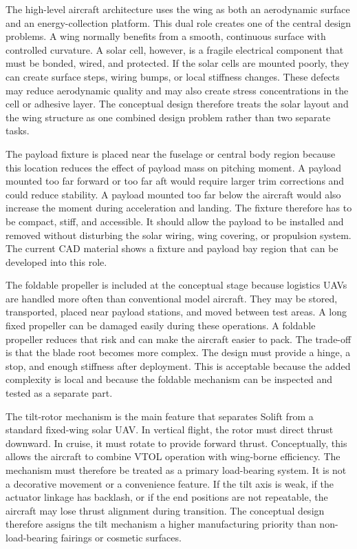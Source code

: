 The high-level aircraft architecture uses the wing as both an aerodynamic surface and an energy-collection platform. This dual role creates one of the central design problems. A wing normally benefits from a smooth, continuous surface with controlled curvature. A solar cell, however, is a fragile electrical component that must be bonded, wired, and protected. If the solar cells are mounted poorly, they can create surface steps, wiring bumps, or local stiffness changes. These defects may reduce aerodynamic quality and may also create stress concentrations in the cell or adhesive layer. The conceptual design therefore treats the solar layout and the wing structure as one combined design problem rather than two separate tasks.

The payload fixture is placed near the fuselage or central body region because this location reduces the effect of payload mass on pitching moment. A payload mounted too far forward or too far aft would require larger trim corrections and could reduce stability. A payload mounted too far below the aircraft would also increase the moment during acceleration and landing. The fixture therefore has to be compact, stiff, and accessible. It should allow the payload to be installed and removed without disturbing the solar wiring, wing covering, or propulsion system. The current CAD material shows a fixture and payload bay region that can be developed into this role.

The foldable propeller is included at the conceptual stage because logistics UAVs are handled more often than conventional model aircraft. They may be stored, transported, placed near payload stations, and moved between test areas. A long fixed propeller can be damaged easily during these operations. A foldable propeller reduces that risk and can make the aircraft easier to pack. The trade-off is that the blade root becomes more complex. The design must provide a hinge, a stop, and enough stiffness after deployment. This is acceptable because the added complexity is local and because the foldable mechanism can be inspected and tested as a separate part.

The tilt-rotor mechanism is the main feature that separates Solift from a standard fixed-wing solar UAV. In vertical flight, the rotor must direct thrust downward. In cruise, it must rotate to provide forward thrust. Conceptually, this allows the aircraft to combine VTOL operation with wing-borne efficiency. The mechanism must therefore be treated as a primary load-bearing system. It is not a decorative movement or a convenience feature. If the tilt axis is weak, if the actuator linkage has backlash, or if the end positions are not repeatable, the aircraft may lose thrust alignment during transition. The conceptual design therefore assigns the tilt mechanism a higher manufacturing priority than non-load-bearing fairings or cosmetic surfaces.

